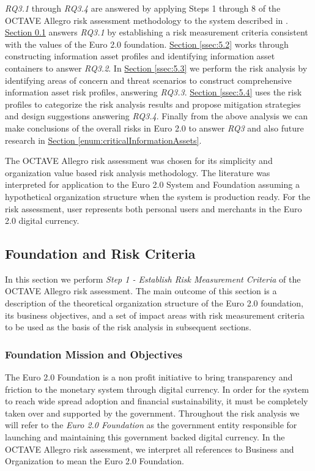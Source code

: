 \documentclass[12pt]{article} %
\newcommand{\hypernameref}[1]{\hyperref[#1]{\nameref{#1}}}
\newcommand{\hypersectionref}[1]{\hyperref[#1]{Section \ref{#1}}}
\begin{document}
{\textit{RQ3.1} through \textit{RQ3.4} are answered by applying Steps 1 through 8 of the OCTAVE Allegro risk assessment methodology\cite{CaralliIntroducingOCTAVE2007} to the system described in \hypernameref{sec:3}. \hypersectionref{ssec:5.1} answers \textit{RQ3.1} by establishing a risk measurement criteria consistent with the values of the Euro 2.0 foundation. \hypersectionref{ssec:5.2} works through constructing information asset profiles and identifying information asset containers to answer \textit{RQ3.2}. In \hypersectionref{ssec:5.3} we perform the risk analysis by identifying areas of concern and threat scenarios to construct comprehensive information asset risk profiles, answering \textit{RQ3.3}. \hypersectionref{ssec:5.4} uses the risk profiles to categorize the risk analysis results and propose mitigation strategies and design suggestions answering \textit{RQ3.4}. Finally from the above analysis we can make conclusions of the overall risks in Euro 2.0 to answer \textit{RQ3} and also future research in \hypersectionref{enum:criticalInformationAssets}.

The OCTAVE Allegro risk assessment was chosen for its simplicity and organization value based risk analysis methodology. The literature was interpreted for application to the Euro 2.0 System and Foundation assuming a hypothetical organization structure when the system is production ready. For the risk assessment, user represents both personal users and merchants in the Euro 2.0 digital currency.

\subsection{Foundation and Risk Criteria} \label{ssec:5.1}
In this section we perform \textit{Step 1 - Establish Risk Measurement Criteria} of the OCTAVE Allegro risk assessment. The main outcome of this section is a description of the theoretical organization structure of the Euro 2.0 foundation, its business objectives, and a set of impact areas with risk measurement criteria to be used as the basis of the risk analysis in subsequent sections.

\subsubsection{Foundation Mission and Objectives} \label{sssec:5.1:objectives}

The Euro 2.0 Foundation is a non profit initiative to bring transparency and friction to the monetary system through digital currency. In order for the system to reach wide spread adoption and financial sustainability, it must be completely taken over and supported by the government. Throughout the risk analysis we will refer to the \textit{Euro 2.0 Foundation} as the government entity responsible for launching and maintaining this government backed digital currency. In the OCTAVE Allegro risk assessment, we interpret all references to Business and Organization to mean the Euro 2.0 Foundation.

}
\end{document}
